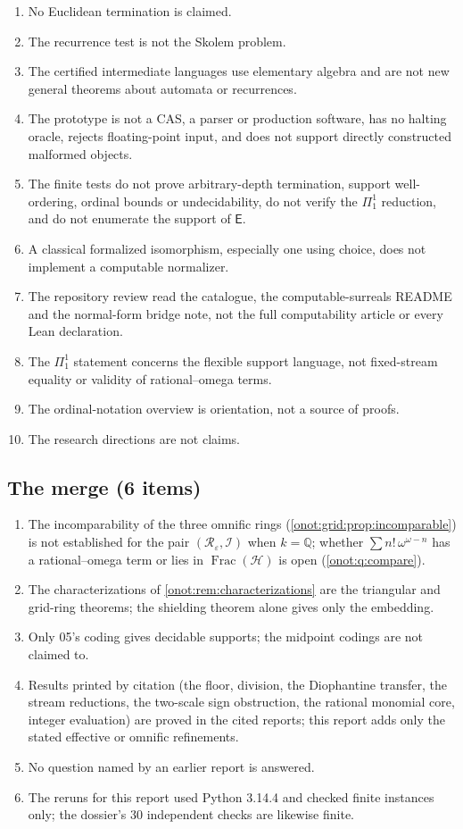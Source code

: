 \documentclass[11pt,oneside]{article}
\numberwithin{equation}{section}
\theoremstyle{definition}
\theoremstyle{remark}
\newcommand{\Q}{\mathbb Q}
\newcommand{\FH}{\operatorname{Frac}(\mathcal H)}
\newcommand{\IO}{\mathcal I}
\begin{document}
\begin{enumerate}[leftmargin=*,widest=00,label=09.\arabic*]
\item No Euclidean termination is claimed.
\item The recurrence test is not the Skolem problem.
\item The certified intermediate languages use elementary algebra and are not new
general theorems about automata or recurrences.
\item The prototype is not a CAS, a parser or production software, has no halting
oracle, rejects floating-point input, and does not support directly constructed
malformed objects.
\item The finite tests do not prove arbitrary-depth termination, support
well-ordering, ordinal bounds or undecidability, do not verify the $\Pi^1_1$
reduction, and do not enumerate the support of $\mathsf E$.
\item A classical formalized isomorphism, especially one using choice, does not
implement a computable normalizer.
\item The repository review read the catalogue, the computable-surreals README and
the normal-form bridge note, not the full computability article or every Lean
declaration.
\item The $\Pi^1_1$ statement concerns the flexible support language, not
fixed-stream equality or validity of rational--omega terms.
\item The ordinal-notation overview is orientation, not a source of proofs.
\item The research directions are not claims.
\end{enumerate}

\subsection{The merge (6 items)}
\begin{enumerate}[leftmargin=*,widest=00,label=M.\arabic*]
\item The incomparability of the three omnific rings
(\cref{onot:grid:prop:incomparable}) is not established for the pair
$(\mathcal R_\varepsilon,\IO)$ when $k=\Q$; whether $\sum n!\,\omega^{\omega-n}$ has a
rational--omega term or lies in $\FH$ is open (\cref{onot:q:compare}).
\item The characterizations of \cref{onot:rem:characterizations} are the triangular
and grid-ring theorems; the shielding theorem alone gives only the embedding.
\item Only 05's coding gives decidable supports; the midpoint codings are not
claimed to.
\item Results printed by citation (the floor, division, the Diophantine transfer,
the stream reductions, the two-scale sign obstruction, the rational monomial core,
integer evaluation) are proved in the cited reports; this report adds only the
stated effective or omnific refinements.
\item No question named by an earlier report is answered.
\item The reruns for this report used Python 3.14.4 and checked finite instances
only; the dossier's 30 independent checks are likewise finite.
\end{enumerate}
\end{document}
